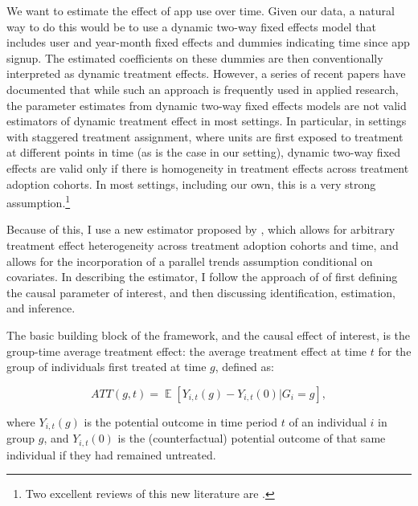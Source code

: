 We want to estimate the effect of app use over time.  Given our data, a natural
way to do this would be to use a dynamic two-way fixed effects model that
includes user and year-month fixed effects and dummies indicating time since
app signup. The estimated coefficients on these dummies are then conventionally
interpreted as dynamic treatment effects. However, a series of recent papers
have documented that while such an approach is frequently used in applied
research, the parameter estimates from dynamic two-way fixed effects models are
not valid estimators of dynamic treatment effect in most settings. In
particular, in settings with staggered treatment assignment, where units are
first exposed to treatment at different points in time (as is the case in our
setting), dynamic two-way fixed effects are valid only if there is homogeneity
in treatment effects across treatment adoption cohorts. In most settings,
including our own, this is a very strong assumption.\footnote{Two excellent
reviews of this new literature are \citet{roth2022trending, baker2022much}.}

Because of this, I use a new estimator proposed by
\citet{callaway2021difference}, which allows for arbitrary treatment effect
heterogeneity across treatment adoption cohorts and time, and allows for the
incorporation of a parallel trends assumption conditional on covariates. In
describing the estimator, I follow the approach of
\citet{callaway2021difference} of first defining the causal parameter of
interest, and then discussing identification, estimation, and inference.

The basic building block of the framework, and the causal effect of interest,
is the group-time average treatment effect: the average treatment effect at
time $t$ for the group of individuals first treated at time $g$, defined as:

\begin{equation}
    ATT(g,t) = \mathop{\mathbb{E}}[Y_{i,t}(g) - Y_{i,t}(0)|G_i =
    g],
\end{equation}

where $Y_{i,t}(g)$ is the potential outcome in time period $t$ of an individual
$i$ in group $g$, and $Y_{i,t}(0)$ is the (counterfactual) potential outcome of that same
individual if they had remained untreated.

